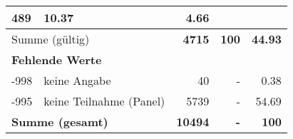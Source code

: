 \begin{longtable}{lXrrr}
       \num{489} &
       \num[round-mode=places,round-precision=2]{10.37} &
         \num[round-mode=places,round-precision=2]{4.66} \\
     \midrule
     \multicolumn{2}{l}{Summe (gültig)} &
       \textbf{\num{4715}} &
     \textbf{\num{100}} &
       \textbf{\num[round-mode=places,round-precision=2]{44.93}} \\
     \multicolumn{5}{l}{\textbf{Fehlende Werte}}\\
       -998 &
       keine Angabe &
         \num{40} &
        - &
         \num[round-mode=places,round-precision=2]{0.38} \\
       -995 &
       keine Teilnahme (Panel) &
         \num{5739} &
        - &
         \num[round-mode=places,round-precision=2]{54.69} \\
     \midrule
     \multicolumn{2}{l}{\textbf{Summe (gesamt)}} &
          \textbf{\num{10494}} &
        \textbf{-} &
        \textbf{\num{100}} \\
     \bottomrule
     \end{longtable}
     
